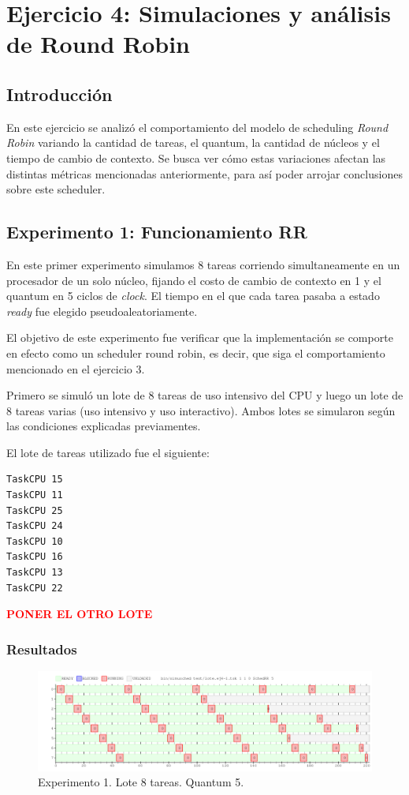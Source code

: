 \documentclass[a4paper]{article}
\begin{document}
\section{Ejercicio 4: Simulaciones y análisis de Round Robin}

\subsection{Introducción}
En este ejercicio se analizó el comportamiento del modelo de scheduling
\textit{Round Robin} variando la cantidad de tareas, el quantum, la cantidad
de núcleos y el tiempo de cambio de contexto. Se busca ver cómo estas
variaciones afectan las distintas métricas mencionadas anteriormente, para
así poder arrojar conclusiones sobre este scheduler.

\subsection{Experimento 1: Funcionamiento RR}
En este primer experimento simulamos 8 tareas corriendo simultaneamente en
un procesador de un solo núcleo, fijando el costo de cambio de contexto en 1
y el quantum en 5 ciclos de \textit{clock}. El tiempo en el que cada tarea
pasaba a estado \textit{ready} fue elegido pseudoaleatoriamente.

El objetivo de este experimento fue verificar que la implementación se
comporte en efecto como un scheduler round robin, es decir, que siga el
comportamiento mencionado en el ejercicio 3.

Primero se simuló un lote de 8 tareas de uso intensivo del CPU y luego un
lote de 8 tareas varias (uso intensivo y uso interactivo). Ambos lotes se
simularon según las condiciones explicadas previamentes.

El lote de tareas utilizado fue el siguiente:

\begin{verbatim}
TaskCPU 15
TaskCPU 11
TaskCPU 25
TaskCPU 24
TaskCPU 10
TaskCPU 16
TaskCPU 13
TaskCPU 22
\end{verbatim}

\textbf{\textcolor{red}{PONER EL OTRO LOTE}}

\subsubsection{Resultados}
\begin{figure}[htb]
\begin{center}
\includegraphics[scale=0.4]{imagenes/ej4-1.png}
\end{center}
\caption{Experimento 1. Lote 8 tareas. Quantum 5.}
\end{figure}
\end{document}
